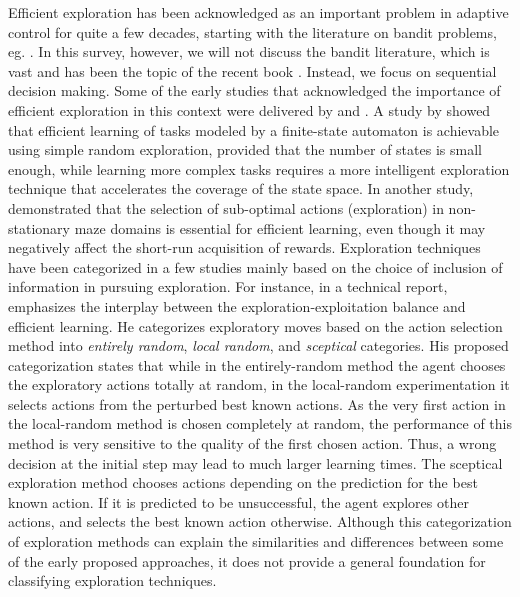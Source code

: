 \label{overview}
Efficient exploration has been acknowledged as an important problem in adaptive control for quite a few decades, starting with the literature on bandit problems, eg. . In this survey, however, we will not discuss the bandit literature, which is vast and has been the topic of the recent book . Instead, we focus on sequential decision making. 
Some of the early studies that acknowledged the importance of efficient exploration in this context were delivered by  and . A study by  showed that efficient learning of tasks modeled by a finite-state automaton is achievable using simple random exploration, provided that the number of states is small enough, while learning more complex tasks requires  a more intelligent exploration technique that accelerates the coverage of the state space. In another study,  demonstrated that the selection of sub-optimal actions (exploration) in non-stationary maze domains is essential for efficient learning, even though it may negatively affect the short-run acquisition of rewards.
Exploration techniques have been categorized in a few studies mainly based on the choice of inclusion of information in pursuing exploration. For instance, in a technical report,  emphasizes the interplay between the exploration-exploitation balance and efficient learning. He categorizes exploratory moves based on the action selection method into \emph{entirely random}, \emph{local random}, and \emph{sceptical} categories. His proposed categorization states that while in the entirely-random method the agent chooses the exploratory actions totally at random, in the local-random experimentation it selects actions from the perturbed best known actions. As the very first action in the local-random method is chosen completely at random, the performance of this method is very sensitive to the quality of the first chosen action. Thus, a wrong decision at the initial step may lead to much larger learning times. The sceptical exploration method chooses actions depending on the prediction for the best known action. If it is predicted to be unsuccessful, the agent explores other actions, and selects the best known action otherwise. Although this categorization of exploration methods can explain the similarities and differences between some of the early proposed approaches, it does not provide a general foundation for classifying exploration techniques.
